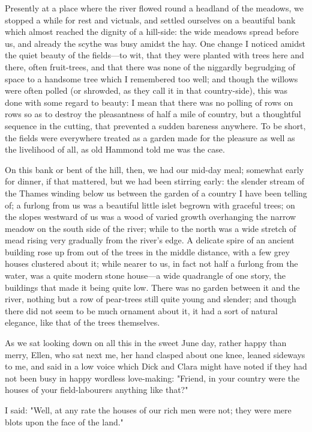 Presently at a place where the river flowed round a headland of the
meadows, we stopped a while for rest and victuals, and settled ourselves
on a beautiful bank which almost reached the dignity of a hill-side: the
wide meadows spread before us, and already the scythe was busy amidst
the hay. One change I noticed amidst the quiet beauty of the fields---to
wit, that they were planted with trees here and there, often
fruit-trees, and that there was none of the niggardly begrudging of
space to a handsome tree which I remembered too well; and though the
willows were often polled (or shrowded, as they call it in that
country-side), this was done with some regard to beauty: I mean that
there was no polling of rows on rows so as to destroy the pleasantness
of half a mile of country, but a thoughtful sequence in the cutting,
that prevented a sudden bareness anywhere. To be short, the fields were
everywhere treated as a garden made for the pleasure as well as the
livelihood of all, as old Hammond told me was the case.

On this bank or bent of the hill, then, we had our mid-day meal;
somewhat early for dinner, if that mattered, but we had been stirring
early: the slender stream of the Thames winding below us between the
garden of a country I have been telling of; a furlong from us was a
beautiful little islet begrown with graceful trees; on the slopes
westward of us was a wood of varied growth overhanging the narrow meadow
on the south side of the river; while to the north was a wide stretch of
mead rising very gradually from the river's edge. A delicate spire of an
ancient building rose up from out of the trees in the middle distance,
with a few grey houses clustered about it; while nearer to us, in fact
not half a furlong from the water, was a quite modern stone house---a
wide quadrangle of one story, the buildings that made it being quite
low. There was no garden between it and the river, nothing but a row of
pear-trees still quite young and slender; and though there did not seem
to be much ornament about it, it had a sort of natural elegance, like
that of the trees themselves.

As we sat looking down on all this in the sweet June day, rather happy
than merry, Ellen, who sat next me, her hand clasped about one knee,
leaned sideways to me, and said in a low voice which Dick and Clara
might have noted if they had not been busy in happy wordless
love-making: "Friend, in your country were the houses of your
field-labourers anything like that?"

I said: "Well, at any rate the houses of our rich men were not; they
were mere blots upon the face of the land."

